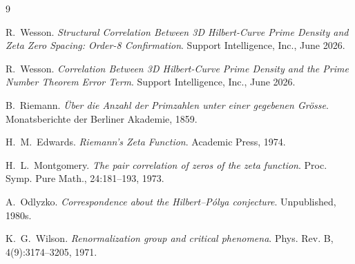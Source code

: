 \documentclass[11pt,a4paper]{article}
\begin{document}
\begin{thebibliography}{9}

R.~Wesson.
\emph{Structural Correlation Between 3D Hilbert-Curve Prime Density and
Zeta Zero Spacing: Order-8 Confirmation}.
Support Intelligence, Inc., June 2026.

R.~Wesson.
\emph{Correlation Between 3D Hilbert-Curve Prime Density and the Prime
Number Theorem Error Term}.
Support Intelligence, Inc., June 2026.

B.~Riemann.
\emph{\"Uber die Anzahl der Primzahlen unter einer gegebenen Gr\"osse}.
Monatsberichte der Berliner Akademie, 1859.

H.~M.~Edwards.
\emph{Riemann's Zeta Function}.
Academic Press, 1974.

H.~L.~Montgomery.
\emph{The pair correlation of zeros of the zeta function}.
Proc. Symp. Pure Math., 24:181--193, 1973.

A.~Odlyzko.
\emph{Correspondence about the Hilbert--P\'{o}lya conjecture}.
Unpublished, 1980s.

K.~G.~Wilson.
\emph{Renormalization group and critical phenomena}.
Phys. Rev. B, 4(9):3174--3205, 1971.

\end{thebibliography}
\end{document}
